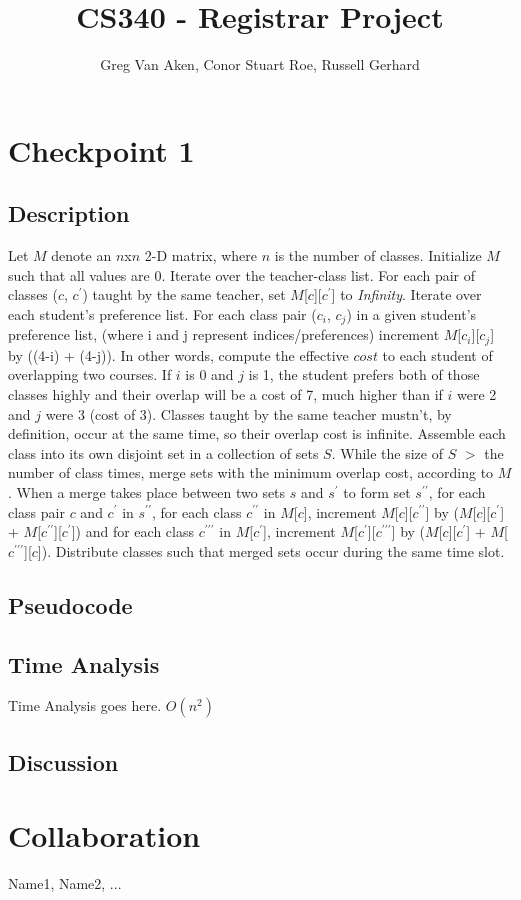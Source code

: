 \documentclass[11pt, oneside]{article}   	%
\title{CS340 - Registrar Project}
\author{Greg Van Aken, Conor Stuart Roe, Russell Gerhard}
\begin{document}
\maketitle

\section{Checkpoint 1}
\subsection{Description}
Let $M$ denote an $n$x$n$ 2-D matrix, where $n$ is the number of classes. Initialize $M$ such that all values are 0. Iterate over the teacher-class list. For each pair of classes ($c$, $c^\prime$) taught by the same teacher, set $M$[$c$][$c^\prime$] to {\it Infinity}. Iterate over each student's preference list. For each class pair ($c_i$, $c_j$) in a given student's preference list, (where i and j represent indices/preferences) increment $M$[$c_i$][$c_j$] by ((4-i) + (4-j)). In other words, compute the effective $cost$ to each student of overlapping two courses. If $i$ is 0 and $j$ is 1, the student prefers both of those classes highly and their overlap will be a cost of 7, much higher than if $i$ were 2 and $j$ were 3 (cost of 3). Classes taught by the same teacher mustn't, by definition, occur at the same time, so their overlap cost is infinite. Assemble each class into its own disjoint set in a collection of sets $S$. While the size of $S$ $>$ the number of class times, merge sets with the minimum overlap cost, according to $M$. When a merge takes place between two sets $s$ and $s^\prime$ to form set $s^{\prime\prime}$, for each class pair $c$ and $c^\prime$ in $s^{\prime\prime}$, for each class $c^{\prime\prime}$ in $M$[$c$], increment $M$[$c$][$c^{\prime\prime}$] by ($M$[$c$][$c^\prime$] + $M$[$c^{\prime\prime}$][$c^\prime$]) and for each class $c^{\prime\prime\prime}$ in $M$[$c^\prime$], increment $M$[$c^\prime$][$c^{\prime\prime\prime}$] by ($M$[$c$][$c^{\prime}$] + $M$[$c^{\prime\prime\prime}$][$c$]). Distribute classes such that merged sets occur during the same time slot.

\subsection{Pseudocode}
\begin{algorithm}
\end{algorithm}

\subsection{Time Analysis}
Time Analysis goes here. $O(n^2)$


\subsection{Discussion}

\section*{Collaboration}
Name1, Name2, ...
\end{document}
